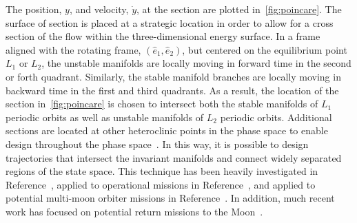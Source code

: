 \documentclass[preprint]{elsarticle}
\begin{document}
The position, \( y \), and velocity, \( \dot{y} \), at the \Poincare section are plotted in~\cref{fig:poincare}.
The surface of section is placed at a strategic location in order to allow for a cross section of the flow within the three-dimensional energy surface. 
In a frame aligned with the rotating frame, \( ( \hat{e}_1, \hat{e}_2 ) \), but centered on the equilibrium point \( L_1 \) or \( L_2\), the unstable manifolds are locally moving in forward time in the second or forth quadrant. 
Similarly, the stable manifold branches are locally moving in backward time in the first and third quadrants. 
As a result, the location of the section in~\cref{fig:poincare} is chosen to intersect both the stable manifolds of \( L_1 \) periodic orbits as well as unstable manifolds of \( L_2 \) periodic orbits.
Additional \Poincare sections are located at other heteroclinic points in the phase space to enable design throughout the phase space~\cite{koon2011}.
In this way, it is possible to design trajectories that intersect the invariant manifolds and connect widely separated regions of the state space. 
This technique has been heavily investigated in Reference~, applied to operational missions in Reference~, and applied to potential multi-moon orbiter missions in Reference~.
In addition, much recent work has focused on potential return missions to the Moon~\cite{zanzottera2012,campagnola2012,mingotti2011,ozimek2010a,mingotti2009}.
\end{document}
